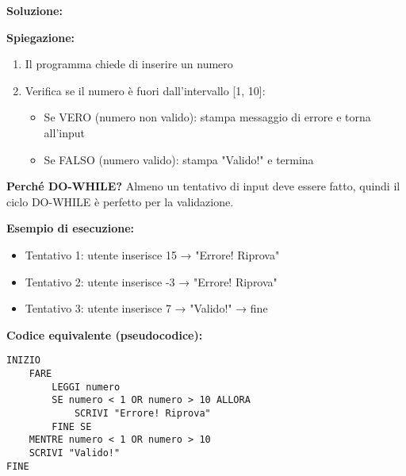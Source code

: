 \documentclass[a4paper,16pt]{article}
\begin{document}
\textbf{Soluzione:}

\begin{center}
\end{center}

\textbf{Spiegazione:}
\begin{enumerate}
    \item Il programma chiede di inserire un numero
    \item Verifica se il numero è fuori dall'intervallo [1, 10]:
    \begin{itemize}
        \item Se VERO (numero non valido): stampa messaggio di errore e torna all'input
        \item Se FALSO (numero valido): stampa "Valido!" e termina
    \end{itemize}
\end{enumerate}

\textbf{Perché DO-WHILE?} Almeno un tentativo di input deve essere fatto, quindi il ciclo DO-WHILE è perfetto per la validazione.

\textbf{Esempio di esecuzione:}
\begin{itemize}
    \item Tentativo 1: utente inserisce 15 → "Errore! Riprova"
    \item Tentativo 2: utente inserisce -3 → "Errore! Riprova"
    \item Tentativo 3: utente inserisce 7 → "Valido!" → fine
\end{itemize}

\textbf{Codice equivalente (pseudocodice):}
\begin{lstlisting}
INIZIO
    FARE
        LEGGI numero
        SE numero < 1 OR numero > 10 ALLORA
            SCRIVI "Errore! Riprova"
        FINE SE
    MENTRE numero < 1 OR numero > 10
    SCRIVI "Valido!"
FINE
\end{lstlisting}
\end{document}
